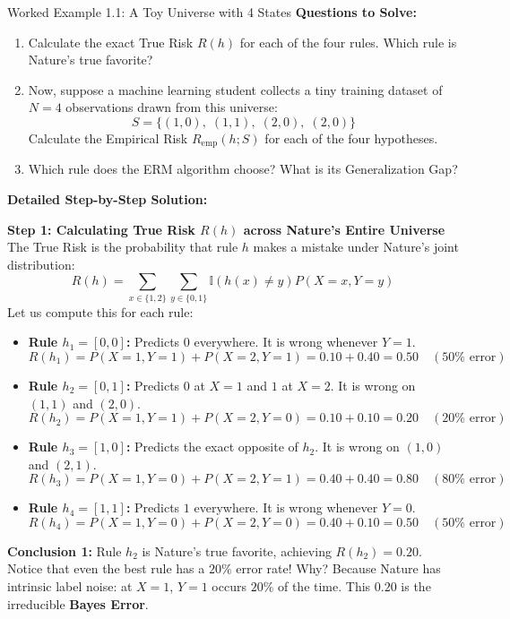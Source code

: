 \begin{examplebox}{Worked Example 1.1: A Toy Universe with 4 States}
\textbf{Questions to Solve:}
\begin{enumerate}
    \item Calculate the exact True Risk $R(h)$ for each of the four rules. Which rule is Nature's true favorite?
    \item Now, suppose a machine learning student collects a tiny training dataset of $N = 4$ observations drawn from this universe:
    \begin{equation*}
    S = \big\{ (1, 0), \; (1, 1), \; (2, 0), \; (2, 0) \big\}
    \end{equation*}
    Calculate the Empirical Risk $R_{\text{emp}}(h; S)$ for each of the four hypotheses.
    \item Which rule does the ERM algorithm choose? What is its Generalization Gap?
\end{enumerate}

\tcblower
\textbf{Detailed Step-by-Step Solution:}

\textbf{Step 1: Calculating True Risk $R(h)$ across Nature's Entire Universe}
The True Risk is the probability that rule $h$ makes a mistake under Nature's joint distribution:
\begin{equation*}
R(h) = \sum_{x \in \{1, 2\}} \sum_{y \in \{0, 1\}} \mathbb{I}(h(x) \ne y) P(X = x, Y = y)
\end{equation*}
Let us compute this for each rule:
\begin{itemize}
    \item \textbf{Rule $h_1 = [0, 0]$:} Predicts $0$ everywhere. It is wrong whenever $Y = 1$.
    \begin{equation*}
    R(h_1) = P(X=1, Y=1) + P(X=2, Y=1) = 0.10 + 0.40 = \mathbf{0.50} \quad (50\% \text{ error})
    \end{equation*}
    \item \textbf{Rule $h_2 = [0, 1]$:} Predicts $0$ at $X=1$ and $1$ at $X=2$. It is wrong on $(1, 1)$ and $(2, 0)$.
    \begin{equation*}
    R(h_2) = P(X=1, Y=1) + P(X=2, Y=0) = 0.10 + 0.10 = \mathbf{0.20} \quad (20\% \text{ error})
    \end{equation*}
    \item \textbf{Rule $h_3 = [1, 0]$:} Predicts the exact opposite of $h_2$. It is wrong on $(1, 0)$ and $(2, 1)$.
    \begin{equation*}
    R(h_3) = P(X=1, Y=0) + P(X=2, Y=1) = 0.40 + 0.40 = \mathbf{0.80} \quad (80\% \text{ error})
    \end{equation*}
    \item \textbf{Rule $h_4 = [1, 1]$:} Predicts $1$ everywhere. It is wrong whenever $Y = 0$.
    \begin{equation*}
    R(h_4) = P(X=1, Y=0) + P(X=2, Y=0) = 0.40 + 0.10 = \mathbf{0.50} \quad (50\% \text{ error})
    \end{equation*}
\end{itemize}
\textbf{Conclusion 1:} Rule $h_2$ is Nature's true favorite, achieving $R(h_2) = 0.20$. Notice that even the best rule has a $20\%$ error rate! Why? Because Nature has intrinsic label noise: at $X=1$, $Y=1$ occurs $20\%$ of the time. This $0.20$ is the irreducible \textbf{Bayes Error}.


\end{examplebox}
